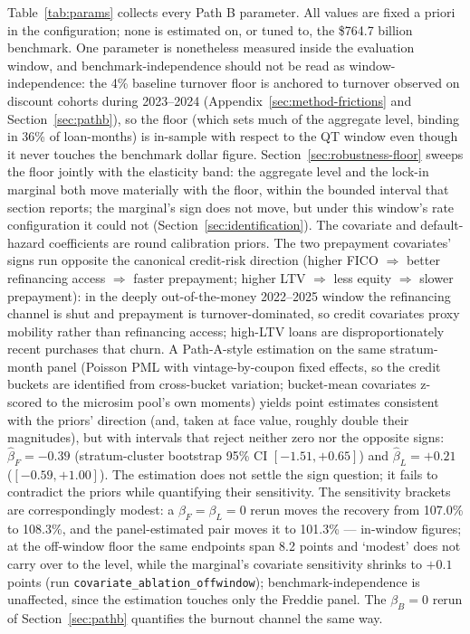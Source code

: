 \documentclass[12pt]{article}
\begin{document}
Table~\ref{tab:params} collects every Path B parameter. All values are fixed a priori in the configuration; none is estimated on, or tuned to, the \$764.7 billion benchmark. One parameter is nonetheless measured inside the evaluation window, and benchmark-independence should not be read as window-independence: the 4\% baseline turnover floor is anchored to turnover observed on discount cohorts during 2023--2024 (Appendix~\ref{sec:method-frictions} and Section~\ref{sec:pathb}), so the floor (which sets much of the aggregate level, binding in 36\% of loan-months) is in-sample with respect to the QT window even though it never touches the benchmark dollar figure. Section~\ref{sec:robustness-floor} sweeps the floor jointly with the elasticity band: the aggregate level and the lock-in marginal both move materially with the floor, within the bounded interval that section reports; the marginal's sign does not move, but under this window's rate configuration it could not (Section~\ref{sec:identification}). The covariate and default-hazard coefficients are round calibration priors. The two prepayment covariates' signs run opposite the canonical credit-risk direction (higher FICO $\Rightarrow$ better refinancing access $\Rightarrow$ faster prepayment; higher LTV $\Rightarrow$ less equity $\Rightarrow$ slower prepayment): in the deeply out-of-the-money 2022--2025 window the refinancing channel is shut and prepayment is turnover-dominated, so credit covariates proxy mobility rather than refinancing access; high-LTV loans are disproportionately recent purchases that churn. A Path-A-style estimation on the same stratum-month panel (Poisson PML with vintage-by-coupon fixed effects, so the credit buckets are identified from cross-bucket variation; bucket-mean covariates z-scored to the microsim pool's own moments) yields point estimates consistent with the priors' direction (and, taken at face value, roughly double their magnitudes), but with intervals that reject neither zero nor the opposite signs: $\hat{\beta}_F = -0.39$ (stratum-cluster bootstrap 95\% CI $[-1.51, +0.65]$) and $\hat{\beta}_L = +0.21$ ($[-0.59, +1.00]$). The estimation does not settle the sign question; it fails to contradict the priors while quantifying their sensitivity. The sensitivity brackets are correspondingly modest: a $\beta_F = \beta_L = 0$ rerun moves the recovery from 107.0\% to 108.3\%, and the panel-estimated pair moves it to 101.3\% --- in-window figures; at the off-window floor the same endpoints span 8.2 points and `modest' does not carry over to the level, while the marginal's covariate sensitivity shrinks to $+0.1$ points (run \texttt{covariate\_ablation\_offwindow}); benchmark-independence is unaffected, since the estimation touches only the Freddie panel. The $\beta_B = 0$ rerun of Section~\ref{sec:pathb} quantifies the burnout channel the same way.
\end{document}
